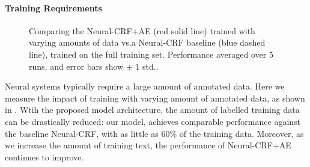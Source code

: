 \paragraph{Training Requirements}

\begin{figure}[t]

\hspace{-1.5ex}

\vspace{-2ex}
\caption{Comparing the Neural-CRF+AE (red solid line) trained with varying amounts of data vs.\@ a Neural-CRF baseline (blue dashed line), trained on the full training set. Performance averaged over 5 runs, and error bars show $\pm$ 1 std.\@dev.}
\label{figure2}
\end{figure}

Neural systems typically require a large amount of annotated data.
Here we measure the impact of training with varying amount of annotated data,  as shown in  .
Wtih the proposed model architecture, the amount of labelled training data can be drastically reduced:
our model, achieves comparable performance against the baseline Neural-CRF, with as little as 60\% of the training data. 
Moreover, as we increase the amount of training text, the performance of Neural-CRF+AE continues to improve.

